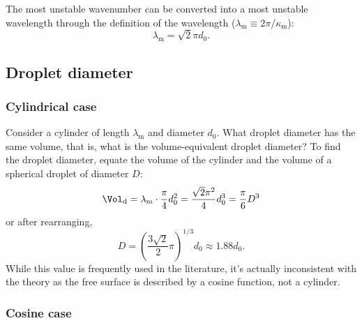 \documentclass[ccbysa,note]{bmtreport}
\begin{document}
The most unstable wavenumber can be converted into a most unstable wavelength through the definition of the wavelength ($\lambda_\text{m} \equiv 2 \pi / \kappa_\text{m}$):
\begin{equation}
   \lambda_\text{m} = \sqrt{2} \pi d_0. \label{eq:most unstable wavelength}
\end{equation}

\subsection{Droplet diameter}

\subsubsection{Cylindrical case}

Consider a cylinder of length $\lambda_\text{m}$ and diameter $d_0$. What droplet diameter has the same volume, that is, what is the volume-equivalent droplet diameter? To find the droplet diameter, equate the volume of the cylinder and the volume of a spherical droplet of diameter $D$:
\begin{equation}
   \Vol_\text{d} = \lambda_\text{m} \cdot \frac{\pi}{4} d_0^2 = \frac{\sqrt{2} \pi^2}{4} d_0^3 = \frac{\pi}{6} D^3
\end{equation}
or after rearranging,
\begin{equation}
   D = \left(\frac{3 \sqrt{2}}{2} \pi\right)^{1/3} d_0 \approx 1.88 d_0.
\end{equation}
While this value is frequently used in the literature, it's actually inconsistent with the theory as the free surface is described by a cosine function, not a cylinder.

\subsubsection{Cosine case}
\end{document}

